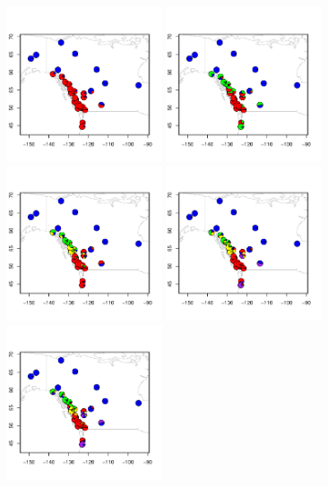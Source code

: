 \documentclass[12pt]{article}
\begin{document}
\begin{figure}
	\centering
			{\includegraphics[width=1.8in,height=1.8in]{figs/populus/populus_sp2.pdf}}
			{\includegraphics[width=1.8in,height=1.8in]{figs/populus/populus_sp3.pdf}}
			{\includegraphics[width=1.8in,height=1.8in]{figs/populus/populus_sp4.pdf}}
			{\includegraphics[width=1.8in,height=1.8in]{figs/populus/populus_sp5.pdf}}
			{\includegraphics[width=1.8in,height=1.8in]{figs/populus/populus_sp6.pdf}}

\end{figure}
\end{document}
